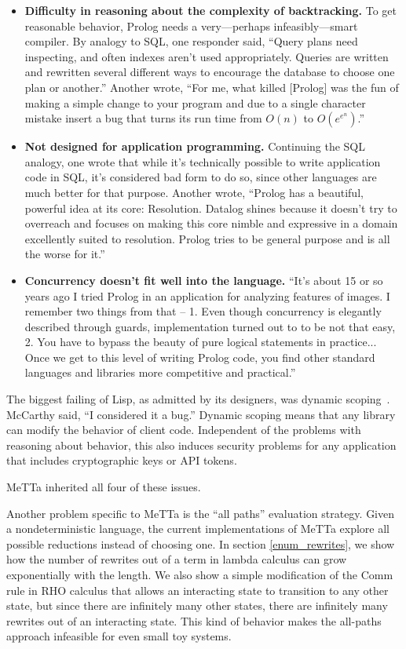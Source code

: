 \documentclass{article}
\begin{document}
\begin{itemize}
    \item {\bf Difficulty in reasoning about the complexity of backtracking.} To get reasonable behavior, Prolog needs a very---perhaps infeasibly---smart compiler.  By analogy to SQL, one responder said, ``Query plans need inspecting, and often indexes aren't used appropriately. Queries are written and rewritten several different ways to encourage the database to choose one plan or another.''  Another wrote, ``For me, what killed [Prolog] was the fun of making a simple change to your program and due to a single character mistake insert a bug that turns its run time from $O(n)$ to $O(e^{e^n})$.''
    \item {\bf Not designed for application programming.} Continuing the SQL analogy, one wrote that while it's technically possible to write application code in SQL, it's considered bad form to do so, since other languages are much better for that purpose.  Another wrote, ``Prolog has a beautiful, powerful idea at its core: Resolution. Datalog shines because it doesn't try to overreach and focuses on making this core nimble and expressive in a domain excellently suited to resolution. Prolog tries to be general purpose and is all the worse for it.''
    \item {\bf Concurrency doesn't fit well into the language.} ``It’s about 15 or so years ago I tried Prolog in an application for analyzing features of images. I remember two things from that – 1. Even though concurrency is elegantly described through guards, implementation turned out to to be not that easy, 2. You have to bypass the beauty of pure logical statements in practice... Once we get to this level of writing Prolog code, you find other standard languages and libraries more competitive and practical.''
\end{itemize}

The biggest failing of Lisp, as admitted by its designers, was dynamic scoping~\cite{McCarthy1978}.  McCarthy said, ``I considered it a bug.''  Dynamic scoping means that any library can modify the behavior of client code.  Independent of the problems with reasoning about behavior, this also induces security problems for any application that includes cryptographic keys or API tokens.

MeTTa inherited all four of these issues.

Another problem specific to MeTTa is the ``all paths'' evaluation strategy.  Given a nondeterministic language, the current implementations of MeTTa explore all possible reductions instead of choosing one.  In section \ref{enum_rewrites}, we show how the number of rewrites out of a term in lambda calculus can grow exponentially with the length.  We also show a simple modification of the Comm rule in RHO calculus that allows an interacting state to transition to any other state, but since there are infinitely many other states, there are infinitely many rewrites out of an interacting state.  This kind of behavior makes the all-paths approach infeasible for even small toy systems.
\end{document}
